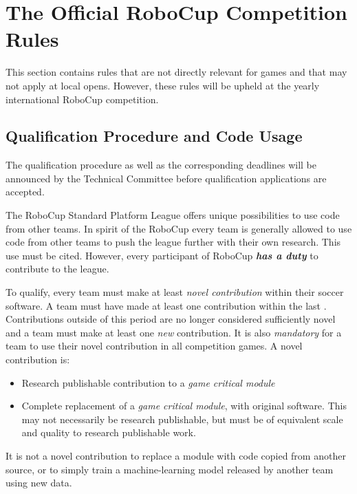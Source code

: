 \section{The Official RoboCup Competition Rules}
\label{sec:comRules}
This section contains rules that are not directly relevant for games and that may not apply at local opens.  However, these rules will be upheld at the yearly international RoboCup competition.

\subsection{Qualification Procedure and Code Usage}
\label{sec:qualification_procedure_codeuse}

The qualification procedure as well as the corresponding deadlines will be announced by the Technical Committee before qualification applications are accepted.

The RoboCup Standard Platform League offers unique possibilities to use code from other teams. In spirit of the RoboCup every team is generally allowed to use code from other teams to push the league further with their own research.
This use must be cited.
However, every participant of RoboCup \textbf{\textit{has a duty}} to contribute to the league.

To qualify, every team must make at least \textit{novel contribution} within their soccer software.
A team must have made at least one contribution within the last \NovelContributionTime.
Contributions outside of this period are no longer considered sufficiently novel and a team must make at least one \textit{new} contribution.
It is also \textit{mandatory} for a team to use their novel contribution in all competition games.
A novel contribution is:
\begin{itemize}
  \item Research publishable contribution to a \textit{game critical module}
  \item Complete replacement of a \textit{game critical module}, with original software. This may not necessarily be research publishable, but must be of equivalent scale and quality to research publishable work.
\end{itemize}

It is not a novel contribution to replace a module with code copied from another source, or to simply train a machine-learning model released by another team using new data.

